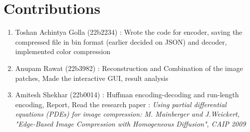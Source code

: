 \documentclass[12pt, a4paper]{report}
\begin{document}
	\chapter{Contributions}
	\begin{enumerate}
		\item Toshan Achintya Golla (22b2234) : Wrote the code for encoder, saving the compressed file in bin format (earlier decided on JSON) and decoder, implemented color compression
		\item Anupam Rawat (22b3982) : Reconstruction and Combination of the image patches, Made the interactive GUI, result analysis
		\item Amitesh Shekhar (22b0014) : Huffman encoding-decoding and run-length encoding, Report, Read the research paper : \textit{Using partial differential equations (PDEs) for image compression: M. Mainberger and J.Weickert, "Edge-Based Image Compression with Homogeneous Diffusion", CAIP 2009}
	\end{enumerate}
	
\end{document}

